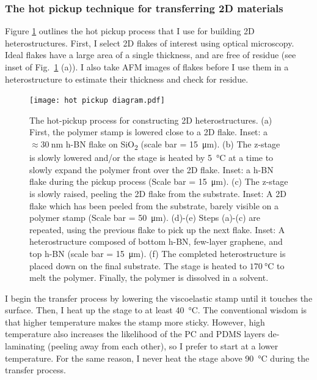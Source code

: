 \documentclass{beavtex_dub_edit}
\begin{document}
\subsubsection{The hot pickup technique for transferring 2D materials} \label{the hot pickup proces}
Figure \ref{hot pickup diagram} outlines the hot pickup process that I use for building 2D heterostructures. First, I select 2D flakes of interest using optical microscopy. Ideal flakes have a large area of a single thickness, and are free of residue (see inset of Fig.\ \ref{hot pickup diagram} (a)). I also take AFM images of flakes before I use them in a heterostructure to estimate their thickness and check for residue. 

\begin{figure}
    \texttt{[image: hot pickup diagram.pdf]}
    \caption[The hot-pickup process for constructing 2D heterostructures.]{The hot-pickup process for constructing 2D heterostructures. (a) First, the polymer stamp is lowered close to a 2D flake. Inset: a $\approx \SI{30}{\nano\meter}$ h-BN flake on SiO\textsubscript{2} (scale bar = \SI{15}{\micro\meter}). (b) The z-stage is slowly lowered and/or the stage is heated by \SI{5}{\celsius} at a time to slowly expand the polymer front over the 2D flake. Inset: a h-BN flake during the pickup process (Scale bar = \SI{15}{\micro\meter}). (c) The z-stage is slowly raised, peeling the 2D flake from the substrate. Inset: A 2D flake which has been peeled from the substrate, barely visible on a polymer stamp (Scale bar = \SI{50}{\micro\meter}). (d)-(e) Steps (a)-(c) are repeated, using the previous flake to pick up the next flake. Inset: A heterostructure composed of bottom h-BN, few-layer graphene, and top h-BN (scale bar = \SI{15}{\micro\meter}). (f) The completed heterostructure is placed down on the final substrate. The stage is heated to $\SI{170}{\celsius}$ to melt the polymer. Finally, the polymer is dissolved in a solvent.}
    \label{hot pickup diagram}
\end{figure}

I begin the transfer process by lowering the viscoelastic stamp until it touches the surface. Then, I heat up the stage to at least \SI{40}{\celsius}. The conventional wisdom is that higher temperature makes the stamp more sticky. However, high temperature also increases the likelihood of the PC and PDMS layers de-laminating (peeling away from each other), so I prefer to start at a lower temperature. For the same reason, I never heat the stage above \SI{90}{\celsius} during the transfer process. 
\end{document}
